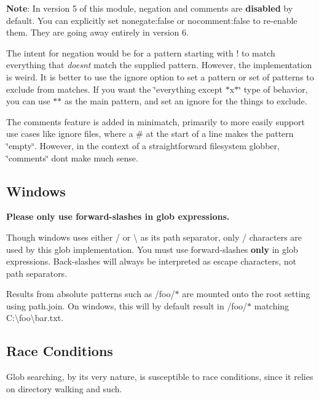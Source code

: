 {\bfseries Note}\+: In version 5 of this module, negation and comments are {\bfseries disabled} by default. You can explicitly set {\ttfamily nonegate\+:false} or {\ttfamily nocomment\+:false} to re-\/enable them. They are going away entirely in version 6.

The intent for negation would be for a pattern starting with {\ttfamily !} to match everything that {\itshape doesn\textquotesingle{}t} match the supplied pattern. However, the implementation is weird. It is better to use the {\ttfamily ignore} option to set a pattern or set of patterns to exclude from matches. If you want the \char`\"{}everything except $\ast$x$\ast$\char`\"{} type of behavior, you can use {\ttfamily $\ast$$\ast$} as the main pattern, and set an {\ttfamily ignore} for the things to exclude.

The comments feature is added in minimatch, primarily to more easily support use cases like ignore files, where a {\ttfamily \#} at the start of a line makes the pattern \char`\"{}empty\char`\"{}. However, in the context of a straightforward filesystem globber, \char`\"{}comments\char`\"{} don\textquotesingle{}t make much sense.

\subsection*{Windows}

{\bfseries Please only use forward-\/slashes in glob expressions.}

Though windows uses either {\ttfamily /} or {\ttfamily \textbackslash{}} as its path separator, only {\ttfamily /} characters are used by this glob implementation. You must use forward-\/slashes {\bfseries only} in glob expressions. Back-\/slashes will always be interpreted as escape characters, not path separators.

Results from absolute patterns such as {\ttfamily /foo/$\ast$} are mounted onto the root setting using {\ttfamily path.\+join}. On windows, this will by default result in {\ttfamily /foo/$\ast$} matching {\ttfamily C\+:\textbackslash{}foo\textbackslash{}bar.\+txt}.

\subsection*{Race Conditions}

Glob searching, by its very nature, is susceptible to race conditions, since it relies on directory walking and such.

